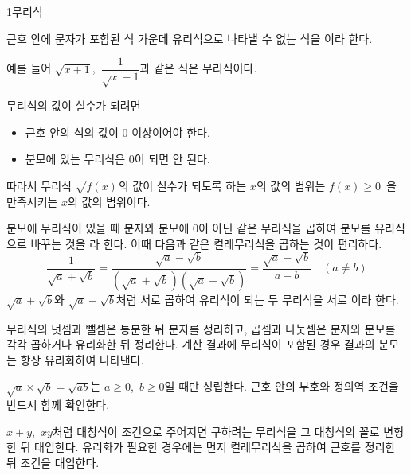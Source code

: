 \documentclass[10pt]{article}
\begin{document}

\begin{dmconcept}{1}{무리식}
\setlength{\parskip}{1.7mm plus 1.8mm minus 0mm}\linespread{1.28}\selectfont%


근호 안에 문자가 포함된 식 가운데 유리식으로 나타낼 수 없는 식을 이라 한다.

예를 들어 $\sqrt{x + 1}$,\ $\dfrac{1}{\sqrt{x} - 1}$과 같은 식은 무리식이다.

무리식의 값이 실수가 되려면
\begin{itemize}[leftmargin=8mm, itemsep=0.5mm, topsep=1mm]
  \item 근호 안의 식의 값이 $0$ 이상이어야 한다.
  \item 분모에 있는 무리식은 $0$이 되면 안 된다.
\end{itemize}
따라서 무리식 $\sqrt{f(x)}$의 값이 실수가 되도록 하는 $x$의 값의 범위는 $f(x) \ge 0$\ 을 만족시키는 $x$의 값의 범위이다.


분모에 무리식이 있을 때 분자와 분모에 $0$이 아닌 같은 무리식을 곱하여 분모를 유리식으로 바꾸는 것을 라 한다. 이때 다음과 같은 켤레무리식을 곱하는 것이 편리하다.
\begin{equation*}
  \frac{1}{\sqrt{a} + \sqrt{b}} = \frac{\sqrt{a} - \sqrt{b}}{(\sqrt{a} + \sqrt{b})(\sqrt{a} - \sqrt{b})} = \frac{\sqrt{a} - \sqrt{b}}{a - b} \quad (a \ne b)
\end{equation*}
$\sqrt{a} + \sqrt{b}$와 $\sqrt{a} - \sqrt{b}$처럼 서로 곱하여 유리식이 되는 두 무리식을 서로 이라 한다.


무리식의 덧셈과 뺄셈은 통분한 뒤 분자를 정리하고, 곱셈과 나눗셈은 분자와 분모를 각각 곱하거나 유리화한 뒤 정리한다. 계산 결과에 무리식이 포함된 경우 결과의 분모는 항상 유리화하여 나타낸다.

\begin{dmnote}
$\sqrt{a} \times \sqrt{b} = \sqrt{ab}$는 $a \ge 0$,\ $b \ge 0$일 때만 성립한다. 근호 안의 부호와 정의역 조건을 반드시 함께 확인한다.
\end{dmnote}


$x + y$,\ $xy$처럼 대칭식이 조건으로 주어지면 구하려는 무리식을 그 대칭식의 꼴로 변형한 뒤 대입한다. 유리화가 필요한 경우에는 먼저 켤레무리식을 곱하여 근호를 정리한 뒤 조건을 대입한다.

\end{dmconcept}
\end{document}
